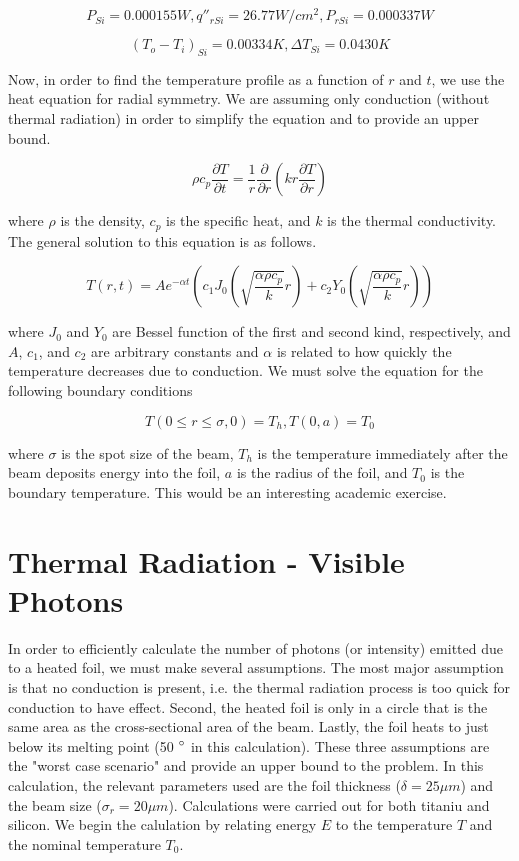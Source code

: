\documentclass[12pt]{article}
\begin{document}
\begin{equation}
P_{Si}= 0.000155 W, q''_{r Si}=26.77 W/cm^2 , P_{r Si}=0.000337 W 
\end{equation}

\begin{equation}
(T_o-T_i)_{Si}=0.00334 K , \Delta T_{Si}=0.0430 K
\end{equation}

Now, in order to find the temperature profile as a function of $r$ and $t$, we use the heat equation for radial symmetry. We are assuming only conduction (without thermal radiation) in order to simplify the equation and to provide an upper bound.

\begin{equation}
\rho c_p \frac{\partial T}{\partial t}=\frac{1}{r} \frac{\partial}{\partial r} (k r \frac{\partial T}{\partial r})
\end{equation}

where $\rho$ is the density, $c_p$ is the specific heat, and $k$ is the thermal conductivity. The general solution to this equation is as follows.

\begin{equation}
T(r,t)=Ae^{-\alpha t} (c_1 J_0(\sqrt{\frac{\alpha \rho c_p}{k}}r)+c_2 Y_0(\sqrt{\frac{\alpha \rho c_p}{k}}r))
\end{equation}

where $J_0$ and $Y_0$ are Bessel function of the first and second kind, respectively, and $A$, $c_1$, and $c_2$ are arbitrary constants and $\alpha$ is related to how quickly the temperature decreases due to conduction. We must solve the equation for the following boundary conditions

\begin{equation}
T(0 \le r \le \sigma,0)=T_h, T(0,a)=T_0
\end{equation}

where $\sigma$ is the spot size of the beam, $T_h$ is the temperature immediately after the beam deposits energy into the foil, $a$ is the radius of the foil, and $T_0$ is the boundary temperature. This would be an interesting academic exercise.

\section{Thermal Radiation - Visible Photons}

In order to efficiently calculate the number of photons (or intensity) emitted due to a heated foil, we must make several assumptions. The most major assumption is that no conduction is present, i.e. the thermal radiation process is too quick for conduction to have effect. Second, the heated foil is only in a circle that is the same area as the cross-sectional area of the beam. Lastly, the foil heats to just below its melting point (50 $\degree$ in this calculation). These three assumptions are the "worst case scenario" and provide an upper bound to the problem. In this calculation, the relevant parameters used are the foil thickness ($\delta=25 \mu m$) and the beam size ($\sigma_r = 20 \mu m$). Calculations were carried out for both titaniu and silicon. We begin the calulation by relating energy $E$ to the temperature $T$ and the nominal temperature $T_0$.
\end{document}
